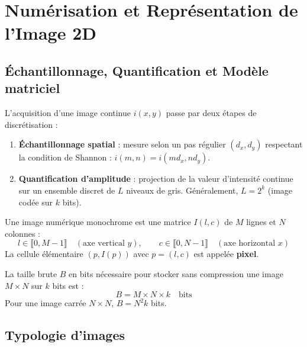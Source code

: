 \minitoc 


\section{Numérisation et Représentation de l'Image 2D}

\subsection{Échantillonnage, Quantification et Modèle matriciel}

L'acquisition d'une image continue $i(x,y)$ passe par deux étapes de discrétisation :
\begin{enumerate}
    \item \textbf{Échantillonnage spatial} : mesure selon un pas régulier $(d_x, d_y)$ respectant la condition de Shannon : $i(m,n) = i(m d_x, n d_y)$.
    \item \textbf{Quantification d'amplitude} : projection de la valeur d'intensité continue sur un ensemble discret de $L$ niveaux de gris. Généralement, $L = 2^k$ (image codée sur $k$ bits).
\end{enumerate}

\begin{definition}
    Une image numérique monochrome est une matrice $I(l,c)$ de $M$ lignes et $N$ colonnes :
    $$ l \in \llbracket 0, M-1 \rrbracket \quad (\text{axe vertical } y), \qquad c \in \llbracket 0, N-1 \rrbracket \quad (\text{axe horizontal } x) $$
    La cellule élémentaire $(p, I(p))$ avec $p = (l,c)$ est appelée \textbf{pixel}.
\end{definition}

\begin{proposition}
    La taille brute $B$ en bits nécessaire pour stocker sans compression une image $M \times N$ sur $k$ bits est :
    \begin{equation}
        B = M \times N \times k \quad \text{bits}
    \end{equation}
    Pour une image carrée $N \times N$, $B = N^2 k$ bits.
\end{proposition}

\subsection{Typologie d'images}

